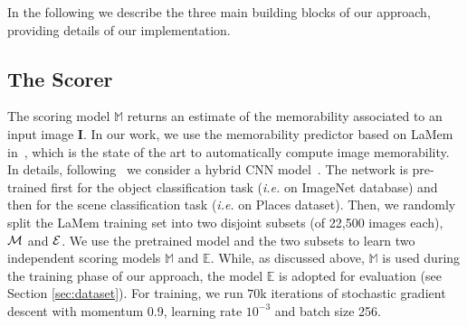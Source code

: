 \documentclass{sig-alternate-05-2015}
\begin{document}
In the following we describe the three main building blocks of our approach, providing details of our implementation.






\subsection{The Scorer}
\label{sec:scoring}

\begin{sloppypar}
The scoring model $\mathbb{M}$ returns an estimate of the memorability associated to an input image $\textbf{I}$. In our work, we use the memorability predictor based on LaMem in~\cite{khosla2015understanding}, which is the state of the art to automatically compute image memorability. In details, following~\cite{khosla2015understanding} we consider a hybrid CNN model~\cite{hybrydcnn}. The network is pre-trained first for the object classification task (\textit{i.e.} on ImageNet database) and then for the scene classification task (\textit{i.e.} on Places dataset). Then, we randomly split the LaMem {training set}%
into 
two disjoint subsets (of 22,500 images each), ${\cal M}$ and ${\cal E}$. We use the pretrained model and the two subsets to learn two independent scoring models $\mathbb{M}$ and $\mathbb{E}$. While, as discussed above, $\mathbb{M}$ is used during the training phase of our approach, the model $\mathbb{E}$ is adopted for evaluation (see Section \ref{sec:dataset}). For training, we run $70$k iterations of stochastic gradient descent with momentum 0.9, learning rate $10^{-3}$ and batch size 256. 
\end{sloppypar}
\end{document}
